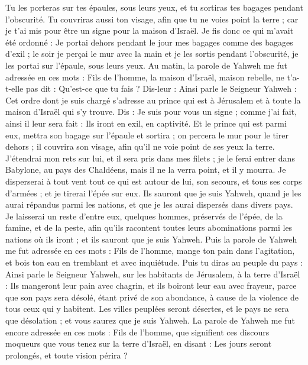 \begin{multicols}{2}
Tu les porteras sur tes épaules, sous leurs yeux, et tu sortiras tes bagages pendant l'obscurité. Tu couvriras aussi ton visage, afin que tu ne voies point la terre ; car je t'ai mis pour être un signe pour la maison d'Israël.
Je fis donc ce qui m'avait été ordonné : Je portai dehors pendant le jour mes bagages comme des bagages d'exil ; le soir je perçai le mur avec la main et je les sortis pendant l'obscurité, je les portai sur l'épaule, sous leurs yeux.
Au matin, la parole de Yahweh me fut adressée en ces mots :
Fils de l'homme, la maison d'Israël, maison rebelle, ne t'a-t-elle pas dit : Qu'est-ce que tu fais ?
Dis-leur : Ainsi parle le Seigneur Yahweh : Cet ordre dont je suis chargé s'adresse au prince qui est à Jérusalem et à toute la maison d'Israël qui s'y trouve.
Dis : Je suis pour vous un signe ; comme j'ai fait, ainsi il leur sera fait : Ils iront en exil, en captivité.
Et le prince qui est parmi eux, mettra son bagage sur l'épaule et sortira ; on percera le mur pour le tirer dehors ; il couvrira son visage, afin qu'il ne voie point de ses yeux la terre.
J'étendrai mon rets sur lui, et il sera pris dans mes filets ; je le ferai entrer dans Babylone, au pays des Chaldéens, mais il ne la verra point, et il y mourra.
Je disperserai à tout vent tout ce qui est autour de lui, son secours, et tous ses corps d'armées ; et je tirerai l'épée sur eux.
Ils sauront que je suis Yahweh, quand je les aurai répandus parmi les nations, et que je les aurai dispersés dans divers pays.
Je laisserai un reste d'entre eux, quelques hommes, préservés de l'épée, de la famine, et de la peste, afin qu'ils racontent toutes leurs abominations parmi les nations où ils iront ; et ils sauront que je suis Yahweh.
Puis la parole de Yahweh me fut adressée en ces mots :
Fils de l'homme, mange ton pain dans l'agitation, et bois ton eau en tremblant et avec inquiétude.
Puis tu diras au peuple du pays : Ainsi parle le Seigneur Yahweh, sur les habitants de Jérusalem, à la terre d'Israël : Ils mangeront leur pain avec chagrin, et ils boiront leur eau avec frayeur, parce que son pays sera désolé, étant privé de son abondance, à cause de la violence de tous ceux qui y habitent.
Les villes peuplées seront désertes, et le pays ne sera que désolation ; et vous saurez que je suis Yahweh.
La parole de Yahweh me fut encore adressée en ces mots :
Fils de l'homme, que signifient ces discours moqueurs que vous tenez sur la terre d'Israël, en disant : Les jours seront prolongés, et toute vision périra ?

\end{multicols}
